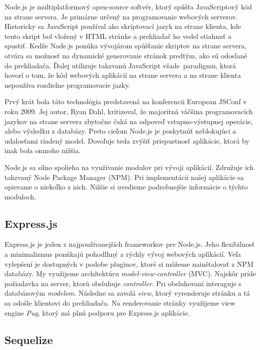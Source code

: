 Node.js je multiplatformový open-source softvér, ktorý spúšťa JavaScriptový
kód na strane servera. Je primárne určený na programovanie webových serverov.
Historicky sa JavaScript používal ako skriptovací jazyk
na strane klienta, kde tento skript bol vložený v HTML stránke a prehliadač ho vedel
stiahnuť a spustiť. Kedže Node.js ponúka vývojárom spúšťanie skriptov na strane servera,
otvára sa možnosť na dynamické generovanie stránok predtým, ako sú odoslané do
prehliadača. Ďalej utilizuje takzvanú \glqq JavaScript všade\grqq~paradigmu, ktorá
hovorí o tom, že kód webových aplikácií na strane servera a na strane klienta nepoužíva rozdielne programovacie jazky.~\cite{bib:nodejs}

Prvý krát bola táto technológia predstavená na konferencii European JSConf v roku 2009.
Jej autor, Ryan Dahl, kritizoval, že majoritná väčšina programovacích jazykov
na strane servera zbytočne čaká na odpoveď vstupno-výstupnej operácie, alebo
výsledku z databázy. Preto cieľom Node.js je poskytnúť neblokujúci a udalosťami
riadený model. Dovoľuje teda zvýšiť priepustnosť aplikácie, ktorá by inak bola omnoho
nižšia.

Node.js sa silno spolieha na využívanie modulov pri vývoji aplikácií. Združuje
ich takzvaný Node Package Manager (NPM). Pri implementácii našej aplikácie sa opierame
o niekoľko z nich. Nižšie si uvedieme podrobnejšie informácie o týchto moduloch. \cite{bib:crawford2017comparison}

\subsection{Express.js}
\label{sec:nodejs:expressjs}

Express.js je jeden z najpoužívanejších frameworkov pre Node.js. Jeho flexibilnosť
a minimalizmus ponúkajú pohodlhný a rýchly vývoj webových aplikácií.
Veľa vylepšení je dostupných v podobe pluginov, ktoré si môžeme nainštalovať z NPM
databázy. My využijeme architektúru \textit{model-view-controller} (MVC). Najskôr príde
požiadavka na server, ktorú obsluhuje \textit{controller}. Pri obsluhovaní
interaguje s databázovým \textit{modelom}. Následne sa zavolá \textit{view}, ktorý 
vyrenderuje stránku a tá sa odošle klientovi do prehliadača. Na renderovanie
stránky využijeme view engine \textit{Pug}, ktorý má plnú podporu pre Express.js
aplikácie.

\subsection{Sequelize}
\label{sec:nodejs:sequelize}

